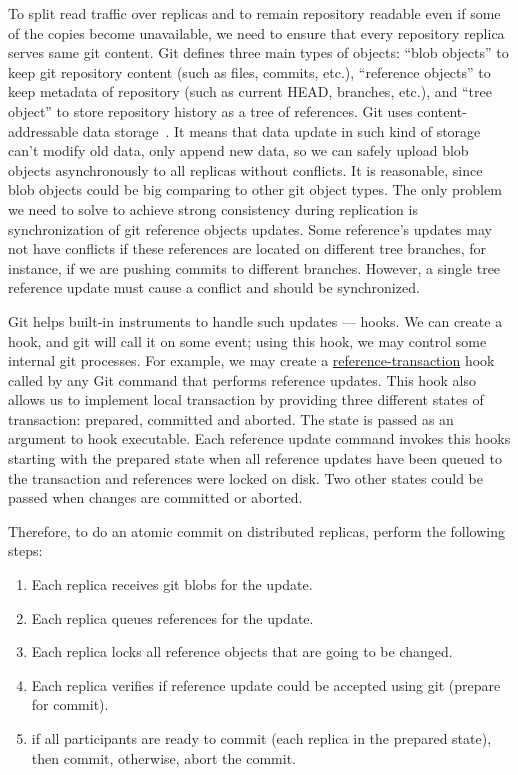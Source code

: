 \documentclass[sigplan, screen, nonacm, 11pt]{acmart}
\begin{document}
To split read traffic over replicas and to remain repository readable even if some of the copies become unavailable,
we need to ensure that every repository replica serves same git content.
Git defines three main types of objects: ``blob objects'' to keep git repository content (such as files, commits, etc.),
``reference objects'' to keep metadata of repository (such as current HEAD, branches, etc.), and ``tree object'' to
store repository history as a tree of references. Git uses content-addressable
data storage~\cite{content-addressable-storage}.
It means that data update in such kind of storage can't modify old data, only append new data, so we can safely
upload blob objects asynchronously to all replicas without conflicts.
It is reasonable, since blob objects could be big comparing to
other git object types. The only problem we need to solve to achieve strong consistency during replication
is synchronization of git reference objects updates. Some reference's updates may not have conflicts if these references
are located on different tree branches, for instance, if we are pushing commits to different branches.
However, a single tree reference update must cause a conflict and should be synchronized.

Git helps built-in instruments to handle such updates --- hooks. We can create a hook, and git will call it on some event;
using this hook, we may control some internal git processes. For example, we may create a
\href{https://git-scm.com/docs/githooks.html\#\_reference\_transaction}{reference-transaction} hook
called by any Git command that performs reference updates. This hook also allows us to implement
local transaction by providing three different states of transaction: prepared, committed and aborted.
The state is passed as an argument to hook executable.
Each reference update command invokes this hooks starting with the prepared state when all reference updates
have been queued to the transaction and references were locked on disk. Two other states could be passed
when changes are committed or aborted.

Therefore, to do an atomic commit on distributed replicas, perform the following steps:
\begin{enumerate}
  \item Each replica receives git blobs for the update.
  \item Each replica queues references for the update.
  \item Each replica locks all reference objects that are going to be changed.
  \item Each replica verifies if reference update could be accepted using git (prepare for commit).
  \item if all participants are ready to commit (each replica in the prepared state), then commit, otherwise, abort the commit.
\end{enumerate}
\end{document}
